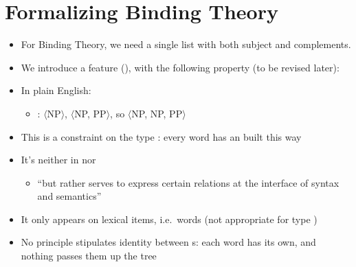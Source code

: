 \documentclass[a4paper,landscape,headrule,footrule]{foils}
\begin{document}
\section[Formalizing binding theory: \ft{arg-st}, the ARP and the Binding Principles]{Formalizing Binding Theory}

\begin{itemize}
\item For Binding Theory, we need a single list with both subject
and complements.
\item We introduce a feature  (),
  with the following property (to be revised later): \\

\item In plain English: 
  \begin{itemize}
  \item {}:  $\langle$NP$\rangle$, 
    $\langle$NP, PP$\rangle$, so  $\langle$NP, NP, PP$\rangle$
  \end{itemize}
\item This is a constraint on the type : every word has
  an  built this way
\end{itemize}

\begin{itemize}
\item It’s neither in  nor 
  \begin{itemize}
  \item ``but rather serves to express certain relations at the
    interface of syntax and semantics''
    \citep[p.~207]{sag:wasow:bender:2003}
  \end{itemize}
\item It only appears on lexical items, i.e.\ words (not
  appropriate for type )
\item No principle stipulates identity
between s: each word has its own, and nothing passes
them up the tree
\end{itemize}
\end{document}
